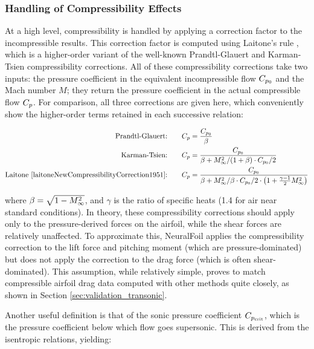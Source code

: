 \documentclass[journal]{new-aiaa}
\begin{document}
\subsubsection{Handling of Compressibility Effects}
\label{sec:compressibility}

At a high level, compressibility is handled by applying a correction factor to the incompressible results. This correction factor is computed using Laitone's rule \cite{laitoneNewCompressibilityCorrection1951}, which is a higher-order variant of the well-known Prandtl-Glauert and Karman-Tsien compressibility corrections. All of these compressibility corrections take two inputs: the pressure coefficient in the equivalent incompressible flow $C_{p_0}$ and the Mach number $M$; they return the pressure coefficient in the actual compressible flow $C_p$. For comparison, all three corrections are given here, which conveniently show the higher-order terms retained in each successive relation:

\begin{align}
    \label{eq:prandtl-glauert} \text{Prandtl-Glauert:} \qquad        & C_p = \frac{C_{p_0}}{\beta}                                                                                    \\
    \label{eq:karman-tsien} \text{Karman-Tsien:}\qquad               & C_p = \frac{C_{p_0}}{\beta + M_\infty^2 / (1 + \beta) \cdot C_{p_0} / 2}                                               \\
    \label{eq:laitone} \text{Laitone \cite{laitoneNewCompressibilityCorrection1951}:}\qquad & C_p = \frac{C_{p_0}}{\beta + M_\infty^2 / \beta \cdot C_{p_0} / 2 \cdot \left( 1 + \frac{\gamma - 1}{2} M_\infty^2 \right)}
\end{align}

\noindent where $\beta = \sqrt{1- M_\infty^2}$, and $\gamma$ is the ratio of specific heats (1.4 for air near standard conditions). In theory, these compressibility corrections should apply only to the pressure-derived forces on the airfoil, while the shear forces are relatively unaffected. To approximate this, NeuralFoil applies the compressibility correction to the lift force and pitching moment (which are pressure-dominated) but does not apply the correction to the drag force (which is often shear-dominated). This assumption, while relatively simple, proves to match compressible airfoil drag data computed with other methods quite closely, as shown in Section \ref{sec:validation_transonic}.

Another useful definition is that of the sonic pressure coefficient $C_{p_{\rm crit}}$, which is the pressure coefficient below which flow goes supersonic. This is derived from the isentropic relations, yielding:
\end{document}
